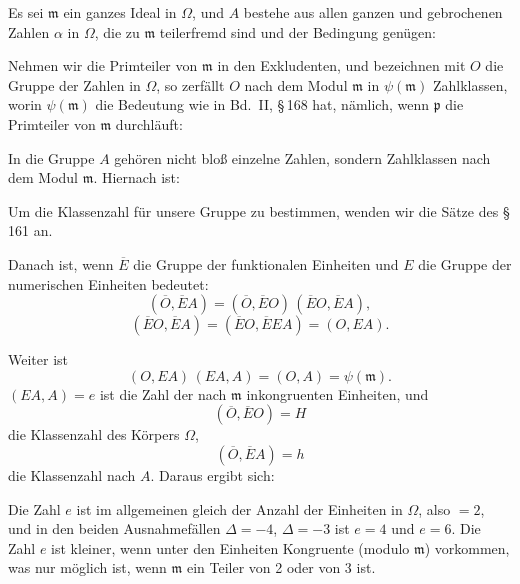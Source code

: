 Es sei $\mathfrak{m}$ ein ganzes Ideal in $\Omega$, und $A$ bestehe aus allen ganzen und gebrochenen Zahlen $\alpha$ in $\Omega$, die zu $\mathfrak{m}$ teilerfremd sind und der Bedingung genügen:

Nehmen wir die Primteiler von $\mathfrak{m}$ in den Exkludenten, und bezeichnen mit $O$ die Gruppe der Zahlen in $\Omega$, so zerfällt $O$ nach dem Modul $\mathfrak{m}$ in $\psi(\mathfrak{m})$ Zahlklassen, worin $\psi(\mathfrak{m})$ die Bedeutung wie in Bd.\ II, \S\,168 hat, nämlich, wenn $\mathfrak{p}$ die Primteiler von $\mathfrak{m}$ durchläuft:

In die Gruppe $A$ gehören nicht bloß einzelne Zahlen, sondern Zahlklassen nach dem Modul $\mathfrak{m}$. Hiernach ist:

Um die Klassenzahl für unsere Gruppe zu bestimmen, wenden wir die Sätze des \S\,161 an.

Danach ist, wenn $\overline{E}$ die Gruppe der funktionalen Einheiten und $E$ die Gruppe der numerischen Einheiten bedeutet:
\[
(\overline{O}, \overline{E}A) = (\overline{O}, \overline{E}O)\,(\overline{E}O, \overline{E}A),
\]
\[
(\overline{E}O, \overline{E}A) = (\overline{E}O, \overline{E}EA) = (O, EA).
\]

Weiter ist
\[
(O, EA)\,(EA, A) = (O, A) = \psi(\mathfrak{m}).
\]
$(EA, A) = e$ ist die Zahl der nach $\mathfrak{m}$ inkongruenten Einheiten, und
\[
(\overline{O}, \overline{E}O) = H
\]
die Klassenzahl des Körpers $\Omega$,
\[
(\overline{O}, \overline{E}A) = h
\]
die Klassenzahl nach $A$. Daraus ergibt sich:

Die Zahl $e$ ist im allgemeinen gleich der Anzahl der Einheiten in $\Omega$, also $= 2$, und in den beiden Ausnahmefällen $\Delta = -4$, $\Delta = -3$ ist $e = 4$ und $e = 6$. Die Zahl $e$ ist kleiner, wenn unter den Einheiten Kongruente (modulo $\mathfrak{m}$) vorkommen, was nur möglich ist, wenn $\mathfrak{m}$ ein Teiler von 2 oder von 3 ist.
